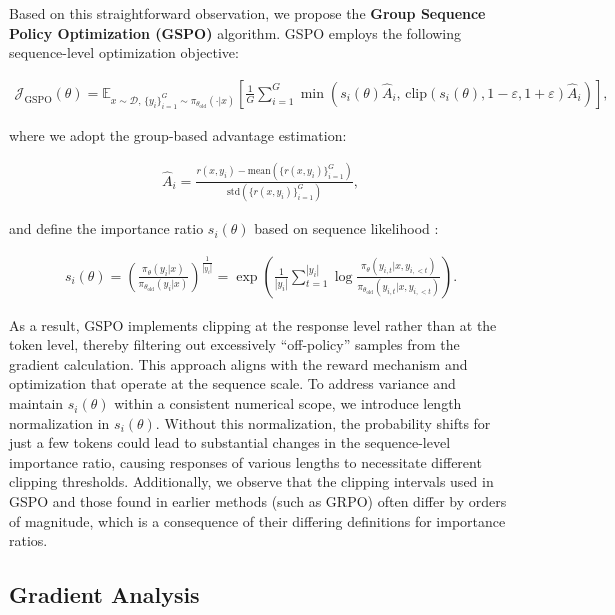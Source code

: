 Based on this straightforward observation, we propose the \textbf{Group Sequence Policy Optimization (GSPO)} algorithm. GSPO employs the following sequence-level optimization objective:

\begin{align}
\mathcal{J}_\text{GSPO} (\theta) =
\mathbb{E}_{ x \sim \mathcal{D},\, \{y_i\}_{i=1}^G \sim \pi_{\theta_\text{old}}( \cdot | x) }
\left[ 
\frac{1}{G} \sum_{i=1}^{G}
\min \left( s_{i}(\theta)  \widehat{A}_{i},  \, \mathrm{clip} \left( s_{i}(\theta), 1 - {\varepsilon}, 1 + {\varepsilon} \right) \widehat{A}_{i} \right) 
\right],
\label{equ:gspo}
\end{align}

where we adopt the group-based advantage estimation:

\begin{align}
\widehat{A}_{i} = \frac{r(x, y_i) - \mathrm{mean} \left( \{ r(x, y_i) \}_{i=1}^G \right) }{ \mathrm{std} \left( \{ r(x, y_i) \}_{i=1}^G \right) },
\end{align}

and define the importance ratio $s_{i}(\theta)$ based on sequence likelihood \citep{click}:

\begin{align}
s_{i}(\theta) = \left( \frac{ \pi_{\theta} (y_i | x) }{ \pi_{\theta_\text{old}} (y_i | x)} \right)^{\frac{1}{|y_i|}}
=
\exp \left( \frac{1}{|y_i|} \sum_{t=1}^{|y_i|} \log \frac{ \pi_{\theta} (y_{i,t} | x, y_{i,<t}) }{ \pi_{\theta_\text{old}} (y_{i,t} | x,y_{i,<t})} \right).
\end{align}

As a result, GSPO implements clipping at the response level rather than at the token level, thereby filtering out excessively ``off-policy'' samples from the gradient calculation. This approach aligns with the reward mechanism and optimization that operate at the sequence scale. To address variance and maintain $s_{i}(\theta)$ within a consistent numerical scope, we introduce length normalization in $s_{i}(\theta)$. Without this normalization, the probability shifts for just a few tokens could lead to substantial changes in the sequence-level importance ratio, causing responses of various lengths to necessitate different clipping thresholds. Additionally, we observe that the clipping intervals used in GSPO and those found in earlier methods (such as GRPO) often differ by orders of magnitude, which is a consequence of their differing definitions for importance ratios.

\subsection{Gradient Analysis}
\label{subsec:gradient}

